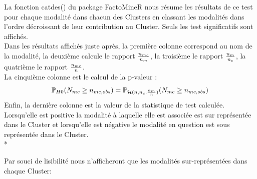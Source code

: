 \documentclass{book}
\begin{document}
\noindent
La fonction catdes() du package FactoMineR nous résume les résultats de ce test pour chaque modalité dans chacun des Clusters en classant les modalités dans l'ordre décroissant de leur contribution au Cluster.
Seuls les test significatifs sont affichés.\\

\noindent
Dans les résultats affichés juste après, la première colonne correspond au nom de la modalité, la deuxième calcule le rapport $n_{mc} \over n_m$, la troisième le rapport $n_m \over n_c$, la quatrième le rapport $n_{mc} \over n$.\\
La cinquième colonne est le calcul de la p-valeur :\\
\begin{equation}
\mathbb{P}_{H0}(N_{mc} \geq n_{mc, obs}) =  \mathbb{P}_{\mathcal{H}(n, n_c, {n_m \over n})}(N_{mc} \geq n_{mc, obs})
\end{equation} 
Enfin, la dernière colonne est la valeur de la statistique de test calculée. Lorsqu'elle est positive la modalité à laquelle elle est associée est sur représentée dans le Cluster et lorsqu'elle est négative le modalité en question est sous représentée dans le Cluster.\\*

\noindent
Par souci de lisibilité nous n'afficheront que les modalités sur-représentées dans chaque Cluster:
\end{document}
